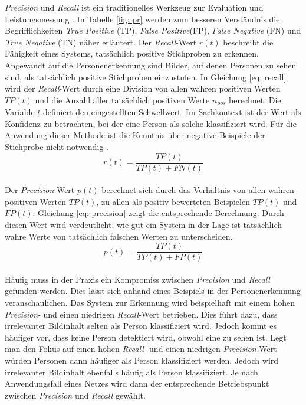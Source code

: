 		
		
		\textit{Precision} und \textit{Recall} ist ein traditionelles Werkzeug zur Evaluation und Leistungsmessung \cite{precisionandrecall}. In Tabelle \ref{fig: pr} werden zum besseren Verständnis die Begrifflichkeiten \textit{True Positive} (TP), \textit{False Positive}(FP), \textit{False Negative} (FN) und \textit{True Negative} (TN) näher erläutert. Der \textit{Recall}-Wert $r(t)$ beschreibt die Fähigkeit eines Systems, tatsächlich positive Stichproben zu erkennen. Angewandt auf die Personenerkennung sind Bilder, auf denen Personen zu sehen sind, als tatsächlich positive Stichproben einzustufen. In Gleichung \ref{eq: recall} wird der \textit{Recall}-Wert durch eine Division von allen wahren positiven Werten $TP(t)$ und die Anzahl aller tatsächlich positiven Werte $n_{pos}$ berechnet. Die Variable $t$ definiert den eingestellten Schwellwert. Im Sachkontext ist der Wert als Konfidenz zu betrachten, bei der eine Person als solche klassifiziert wird. Für die Anwendung dieser Methode ist die Kenntnis über negative Beispiele der Stichprobe nicht notwendig \cite{bildundobjekt}.\\ 
		
		\begin{equation}
		r(t)=\frac{TP(t)}{TP(t)+FN(t)}
		\label{eq: recall}
		\end{equation}\\
		
		Der \textit{Precision}-Wert $p(t)$ berechnet sich durch das Verhältnis von allen wahren positiven Werten $TP(t)$, zu allen als positiv bewerteten Beispielen $TP(t)$ und $FP(t)$. Gleichung \ref{eq: precision} zeigt die entsprechende Berechnung. Durch diesen Wert wird verdeutlicht, wie gut ein System in der Lage ist tatsächlich wahre Werte von tatsächlich falschen Werten zu unterscheiden.\\
		
		\begin{equation}
		p(t)=\frac{TP(t)}{TP(t)+FP(t)}
		\label{eq: precision}
		\end{equation}\\
		
		Häufig muss in der Praxis ein Kompromiss zwischen \textit{Precision} und \textit{Recall} gefunden werden. Dies lässt sich anhand eines Beispiels in der Personenerkennung veranschaulichen. Das System zur Erkennung wird beispielhaft mit einem hohen \textit{Precision}- und einen niedrigen \textit{Recall}-Wert betrieben. Dies führt dazu, dass irrelevanter Bildinhalt selten als Person klassifiziert wird. Jedoch kommt es häufiger vor, dass keine Person detektiert wird, obwohl eine zu sehen ist. Legt man den Fokus auf einen hohen \textit{Recall}- und einen niedrigen \textit{Precision}-Wert würden Personen dann häufiger als Person klassifiziert werden. Jedoch wird irrelevanter Bildinhalt ebenfalls häufig als Person klassifiziert. Je nach Anwendungsfall eines Netzes wird dann der entsprechende Betriebspunkt zwischen \textit{Precision} und \textit{Recall} gewählt.\\
		

